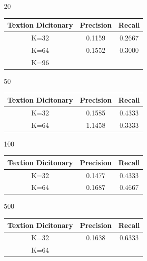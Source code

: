 \documentclass[a4paper]{article}
\begin{document}
20
\begin{table}[t]
\centering
\begin{tabular}{c | c | c}
Textion Dicitonary & Precision & Recall   \\
\hline	
K=32 & 0.1159 & 0.2667 \\
K=64 & 0.1552 & 0.3000 \\
K=96 &  &  \\

\end{tabular}
\label{table:thetable}
\end{table}


50
\begin{table}[t]
\centering
\begin{tabular}{c | c | c}
Textion Dicitonary & Precision & Recall   \\
\hline	
K=32 & 0.1585 & 0.4333 \\
K=64 & 1.1458 & 0.3333 \\


\end{tabular}
\label{table:thetable}
\end{table}

100
\begin{table}[t]
\centering
\begin{tabular}{c | c | c}
Textion Dicitonary & Precision & Recall   \\
\hline	
K=32 & 0.1477 & 0.4333  \\
K=64 & 0.1687 & 0.4667  \\


\end{tabular}
\label{table:thetable}
\end{table}

500
\begin{table}[t]
\centering
\begin{tabular}{c | c | c}
Textion Dicitonary & Precision & Recall   \\
\hline	
K=32 & 0.1638 & 0.6333  \\
K=64 &  &   \\

\end{tabular}
\label{table:thetable}
\end{table}








\end{document}
